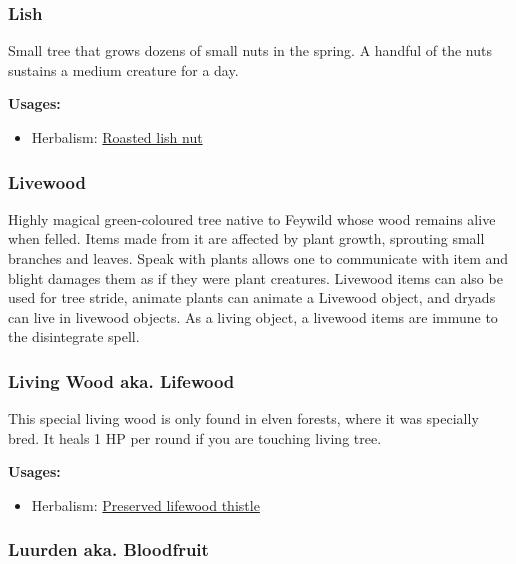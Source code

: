 \subsubsection{Lish}
\label{Lish}

Small tree that grows dozens of small nuts in the spring. A handful of the nuts sustains a medium creature for a day.

\vspace{5mm}

\textbf{Usages:}

\begin{itemize}[noitemsep]
\item[] Herbalism: \hyperref[Roasted lish nut]{Roasted lish nut}
\end{itemize}

\subsubsection{Livewood}
\label{Livewood}

Highly magical green-coloured tree native to Feywild whose wood remains alive when felled. Items made from it are affected by plant growth, sprouting small branches and leaves. Speak with plants allows one to communicate with item and blight damages them as if they were plant creatures. Livewood items can also be used for tree stride, animate plants can animate a Livewood object, and dryads can live in livewood objects. As a living object, a livewood items are immune to the disintegrate spell.

\subsubsection{Living Wood aka. Lifewood}
\label{Lifewood}

This special living wood is only found in elven forests, where it was specially bred. It heals 1 HP per round if you are touching living tree.

\vspace{5mm}

\textbf{Usages:}

\begin{itemize}[noitemsep]
\item[] Herbalism: \hyperref[Preserved lifewood thistle]{Preserved lifewood thistle}
\end{itemize}

\subsubsection{Luurden aka. Bloodfruit}
\label{Luurden}


